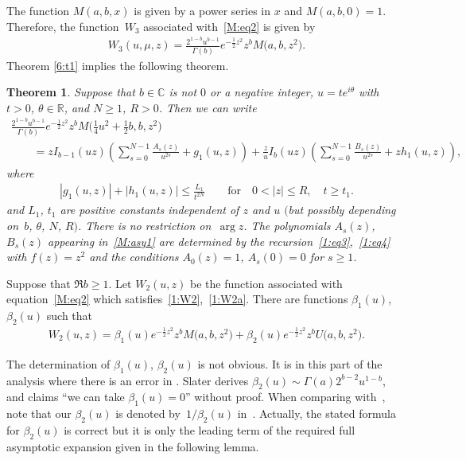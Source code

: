 \documentclass[pdftex]{sigma}
\newcommand{\R}{\mathbb{R}}
\newcommand{\C}{\mathbb{C}}
\numberwithin{equation}{section}
\newtheorem{Theorem}{Theorem}[section]
\begin{document}
The function $M(a,b,x)$ is given by a power series in $x$ and $M(a,b,0)=1$. Therefore, the function~$W_3$ associated with~\eqref{M:eq2}
is given by
\begin{gather}\label{M:W3}
W_3(u,\mu,z)=\frac{2^{1-b}u^{b-1}}{\Gamma(b)} e^{-\frac12z^2}z^b M\big(a,b,z^2\big).
\end{gather}
Theorem \ref{6:t1} implies the following theorem.

\begin{Theorem}\label{M:t1}
Suppose that $b\in\C$ is not $0$ or a negative integer, $u=te^{i\theta}$ with $t>0$, $\theta\in\R$, and $N\ge 1$, $R>0$.
Then we can write
\begin{gather}
 \frac{2^{1-b}u^{b-1}}{\Gamma(b)} e^{-\frac12z^2}z^b M\big(\tfrac14 u^2+\tfrac12 b,b,z^2\big)\nonumber\\
\qquad {} = zI_{b-1}(uz)\left(\sum_{s=0}^{N-1} \frac{A_s(z)}{u^{2s}}+g_1(u,z)\right)
 +\frac{z}{u}I_b(uz)\left(\sum_{s=0}^{N-1} \frac{B_s(z)}{u^{2s}}+zh_1(u,z)\right),\label{M:asy1}
\end{gather}
where
\begin{gather*}%
|g_1(u,z)|+|h_1(u,z)|\le \frac{L_1}{t^{2N}}\qquad \text{for} \quad 0<|z|\le R, \quad t\ge t_1.
\end{gather*}
and $L_1$, $t_1$ are positive constants independent of $z$ and $u$ $($but possibly depending on~$b$, $\theta$, $N$, $R)$. There is no restriction on~$\arg z$. The polynomials $A_s(z)$, $B_s(z)$ appearing in~\eqref{M:asy1}
are determined by the recursion~\eqref{1:eq3},~\eqref{1:eq4} with $f(z)=z^2$ and the conditions $A_0(z)=1$, $A_s(0)=0$ for $s\ge 1$.
\end{Theorem}

Suppose that $\Re b\ge 1$. Let $W_2(u,z)$ be the function associated with equation~\eqref{M:eq2} which satisf\/ies~\eqref{1:W2},~\eqref{1:W2a}. There are functions $\beta_1(u)$, $\beta_2(u)$ such that
\begin{gather}\label{U:connect}
 W_2(u,z)=\beta_1(u) e^{-\frac12z^2}z^b M\big(a,b,z^2\big)+\beta_2(u) e^{-\frac12z^2}z^b U\big(a,b,z^2\big) .
\end{gather}

The determination of $\beta_1(u)$, $\beta_2(u)$ is not obvious.
It is in this part of the analysis where there is an error in \cite{S}. Slater \cite[p.~79]{S} derives $\beta_2(u)\sim\Gamma(a)2^{b-2}u^{1-b}$, and claims ``we can take $\beta_1(u)=0$'' without proof.
When comparing with~\cite{S}, note that our $\beta_2(u)$ is denoted by~$1/\beta_2(u)$ in~\cite{S}.
Actually, the stated formula for $\beta_2(u)$ is correct but it is only the leading term of the required full asymptotic expansion given in the following lemma.
\end{document}
